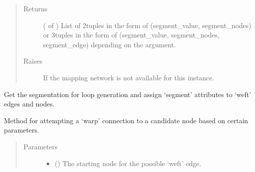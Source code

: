 \documentclass[letterpaper,10pt,english]{sphinxmanual}
\begin{document}
\begin{fulllineitems}
\begin{fulllineitems}
\begin{quote}
\begin{description}
\begin{itemize}
\end{itemize}

\item[{Returns}] \leavevmode
{} ( of ) \textendash{} List of 2\sphinxhyphen{}tuples in the form of (segment\_value, segment\_nodes) or
3\sphinxhyphen{}tuples in the form of (segment\_value, segment\_nodes, segment\_edge)
depending on the  argument.

\item[{Raises}] \leavevmode
{\hyperref[\detokenize{cockatoo:cockatoo.exception.MappingNetworkError}]{}} \textendash{} If the mapping network is not available for this instance.

\end{description}\end{quote}

\end{fulllineitems}


\begin{fulllineitems}
\label{\detokenize{cockatoo:cockatoo.KnitNetwork.assign_segment_attributes}}
Get the segmentation for loop generation and assign ‘segment’ attributes
to ‘weft’ edges and nodes.

\end{fulllineitems}


\begin{fulllineitems}
\label{\detokenize{cockatoo:cockatoo.KnitNetwork.attempt_warp_connection}}
Method for attempting a ‘warp’ connection to a candidate
node based on certain parameters.
\begin{quote}\begin{description}
\item[{Parameters}] \leavevmode\begin{itemize}
\item {} 
 () \textendash{} The starting node for the possible ‘weft’ edge.


\end{itemize}
\end{description}
\end{quote}
\end{fulllineitems}
\end{fulllineitems}
\end{document}
